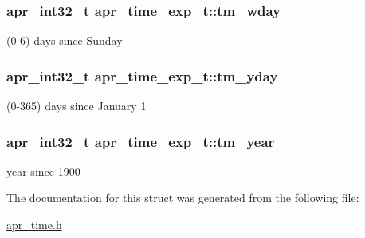 \subsubsection[{\texorpdfstring{tm\+\_\+wday}{tm_wday}}]{\setlength{\rightskip}{0pt plus 5cm}apr\+\_\+int32\+\_\+t apr\+\_\+time\+\_\+exp\+\_\+t\+::tm\+\_\+wday}\hypertarget{structapr__time__exp__t_a57e892bbf3c52df34dcff2c6a9f1adbf}{}\label{structapr__time__exp__t_a57e892bbf3c52df34dcff2c6a9f1adbf}
(0-\/6) days since Sunday 
\subsubsection[{\texorpdfstring{tm\+\_\+yday}{tm_yday}}]{\setlength{\rightskip}{0pt plus 5cm}apr\+\_\+int32\+\_\+t apr\+\_\+time\+\_\+exp\+\_\+t\+::tm\+\_\+yday}\hypertarget{structapr__time__exp__t_aa15c7ab0d7e2a974e89cc1470f1583ab}{}\label{structapr__time__exp__t_aa15c7ab0d7e2a974e89cc1470f1583ab}
(0-\/365) days since January 1 
\subsubsection[{\texorpdfstring{tm\+\_\+year}{tm_year}}]{\setlength{\rightskip}{0pt plus 5cm}apr\+\_\+int32\+\_\+t apr\+\_\+time\+\_\+exp\+\_\+t\+::tm\+\_\+year}\hypertarget{structapr__time__exp__t_a35c32245be49279a6689e34bcd6e534a}{}\label{structapr__time__exp__t_a35c32245be49279a6689e34bcd6e534a}
year since 1900 

The documentation for this struct was generated from the following file\+:\begin{DoxyCompactItemize}
\item 
\hyperlink{apr__time_8h}{apr\+\_\+time.\+h}\end{DoxyCompactItemize}
